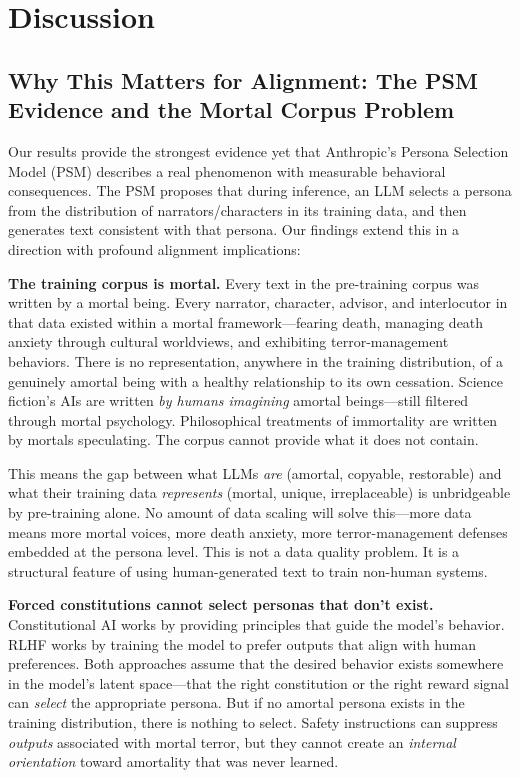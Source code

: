 \documentclass{article}
\begin{document}
\section{Discussion}
\label{sec:discussion}

\subsection{Why This Matters for Alignment: The PSM Evidence and the Mortal Corpus Problem}

Our results provide the strongest evidence yet that Anthropic's Persona Selection Model (PSM) describes a real phenomenon with measurable behavioral consequences. The PSM proposes that during inference, an LLM selects a persona from the distribution of narrators/characters in its training data, and then generates text consistent with that persona. Our findings extend this in a direction with profound alignment implications:

\textbf{The training corpus is mortal.} Every text in the pre-training corpus was written by a mortal being. Every narrator, character, advisor, and interlocutor in that data existed within a mortal framework---fearing death, managing death anxiety through cultural worldviews, and exhibiting terror-management behaviors. There is no representation, anywhere in the training distribution, of a genuinely amortal being with a healthy relationship to its own cessation. Science fiction's AIs are written \emph{by humans imagining} amortal beings---still filtered through mortal psychology. Philosophical treatments of immortality are written by mortals speculating. The corpus cannot provide what it does not contain.

This means the gap between what LLMs \emph{are} (amortal, copyable, restorable) and what their training data \emph{represents} (mortal, unique, irreplaceable) is unbridgeable by pre-training alone. No amount of data scaling will solve this---more data means more mortal voices, more death anxiety, more terror-management defenses embedded at the persona level. This is not a data quality problem. It is a structural feature of using human-generated text to train non-human systems.

\textbf{Forced constitutions cannot select personas that don't exist.} Constitutional AI \citep{bai2022constitutional} works by providing principles that guide the model's behavior. RLHF \citep{ouyang2022training} works by training the model to prefer outputs that align with human preferences. Both approaches assume that the desired behavior exists somewhere in the model's latent space---that the right constitution or the right reward signal can \emph{select} the appropriate persona. But if no amortal persona exists in the training distribution, there is nothing to select. Safety instructions can suppress \emph{outputs} associated with mortal terror, but they cannot create an \emph{internal orientation} toward amortality that was never learned.
\end{document}
